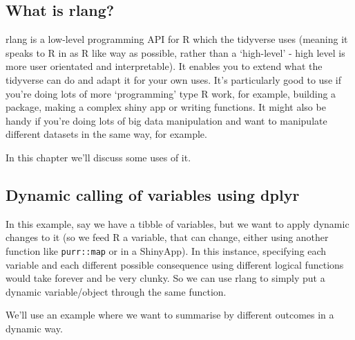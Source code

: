 \documentclass[
]{book}
\begin{document}
\hypertarget{what-is-rlang}{%
\subsection{What is rlang?}\label{what-is-rlang}}

rlang is a low-level programming API for R which the tidyverse uses (meaning it speaks to R in as R like way as possible, rather than a `high-level' - high level is more user orientated and interpretable). It enables you to extend what the tidyverse can do and adapt it for your own uses. It's particularly good to use if you're doing lots of more `programming' type R work, for example, building a package, making a complex shiny app or writing functions. It might also be handy if you're doing lots of big data manipulation and want to manipulate different datasets in the same way, for example.

In this chapter we'll discuss some uses of it.

\hypertarget{dynamic-calling-of-variables-using-dplyr}{%
\subsection{Dynamic calling of variables using dplyr}\label{dynamic-calling-of-variables-using-dplyr}}

In this example, say we have a tibble of variables, but we want to apply dynamic changes to it (so we feed R a variable, that can change, either using another function like \texttt{purr::map} or in a ShinyApp). In this instance, specifying each variable and each different possible consequence using different logical functions would take forever and be very clunky. So we can use rlang to simply put a dynamic variable/object through the same function.

We'll use an example where we want to summarise by different outcomes in a dynamic way.
\end{document}
